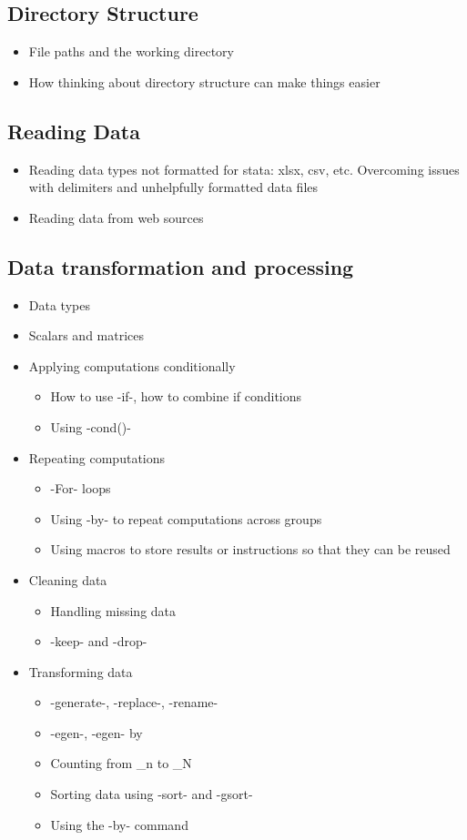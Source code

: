 \documentclass{scrartcl}
\begin{document}
\subsection{Directory Structure}

\begin{itemize}
\item File paths and the working directory
\item How thinking about directory structure can make things easier
\end{itemize}

\subsection{Reading Data}
\begin{itemize}
\item Reading data types not formatted for stata: xlsx, csv, etc. Overcoming issues with delimiters and unhelpfully formatted data files
\item Reading data from web sources
\end{itemize}

\subsection{Data transformation and processing}
\begin{itemize}
\item Data types
\item Scalars and matrices
\item Applying computations conditionally
  \begin{itemize}
    \item How to use -if-, how to combine if conditions
    \item Using -cond()-
  \end{itemize}
\item Repeating computations
  \begin{itemize}
    \item -For- loops
    \item Using -by- to repeat computations across groups
    \item Using macros to store results or instructions so that they can be reused
  \end{itemize}
\item Cleaning data
  \begin{itemize}
    \item Handling missing data
    \item -keep- and -drop-
  \end{itemize}
\item Transforming data
  \begin{itemize}
    \item -generate-, -replace-, -rename-
    \item -egen-, -egen- by
    \item Counting from \_n to \_N
    \item Sorting data using -sort- and -gsort-
    \item Using the -by- command
  \end{itemize}
\end{itemize}
\end{document}
